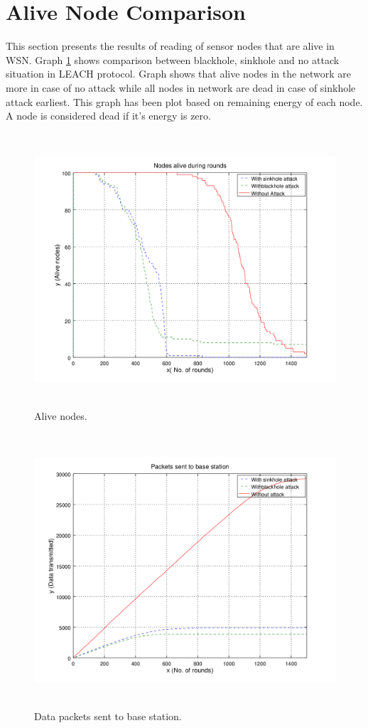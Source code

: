 \section{Alive Node Comparison}
This section presents the results of reading of sensor nodes that are alive in WSN. Graph \ref{alive} shows comparison between blackhole, sinkhole and no attack situation in LEACH protocol. Graph shows that alive nodes in the network are more in case of no attack while all nodes in network are dead in case of sinkhole attack earliest. This graph has been plot based on remaining energy of each node. A node is considered dead if it's energy is zero.
    \begin{figure}[tp]
     \centering
     \includegraphics[width=5.5in, height=4in] {Figures/PNG/alive.png}
     \caption{Alive nodes.}
     \label{alive}
    \end{figure}

    \begin{figure}[bp]
     \centering
     \includegraphics[width=5.5in, height=4in] {Figures/PNG/packets.png}
     \caption{Data packets sent to base station.}
     \label{packets}
    \end{figure}
